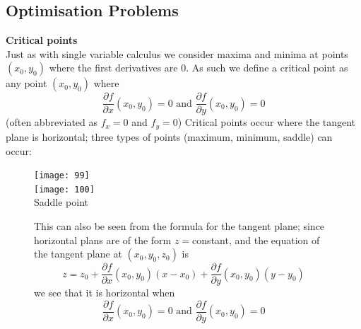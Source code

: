 \documentclass{report}
\begin{document}
\subsection{Optimisation Problems}%
\textbf{Critical points}\\
Just as with single variable calculus we consider maxima and minima at points $(x_0,y_0)$ where the first
derivatives are 0. As such we define a critical point as any point $(x_0,y_0)$ where
\begin{equation*}
\frac{\partial f}{\partial x}(x_0,y_0)=0\text{ and }
\frac{\partial f}{\partial y}(x_0,y_0)=0
\end{equation*}
(often abbreviated as $f_x=0$ and $f_y=0$) Critical points occur where the tangent plane is horizontal; three types
of points (maximum, minimum, saddle) can occur:
\begin{figure}[h]
\begin{center}
\texttt{[image: 99]}\\
\texttt{[image: 100]}\\
Saddle point
\end{center}
This can also be seen from the formula for the tangent plane; since horizontal plans are of the form $z=$constant, 
and the equation of the tangent plane at $(x_0,y_0,z_0)$ is
\begin{equation*}
z=z_0+\frac{\partial f}{\partial x}(x_0,y_0)(x-x_0)+
\frac{\partial f}{\partial y}(x_0,y_0)(y-y_0)
\end{equation*}
we see that it is horizontal when 
\begin{equation*}
\frac{\partial f}{\partial x}(x_0,y_0)=0\text{ and }
\frac{\partial f}{\partial y}(x_0,y_0)=0
\end{equation*}
\end{figure}
\end{document}

